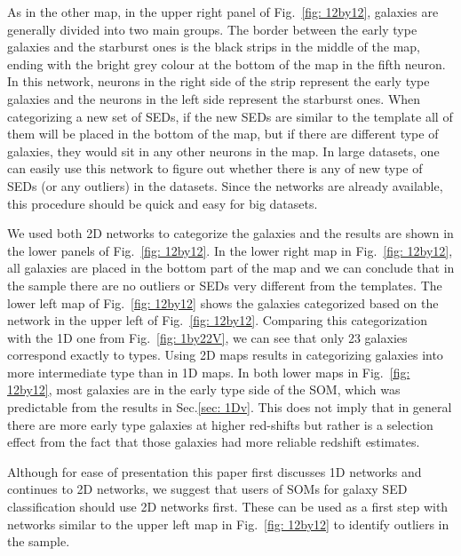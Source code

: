     As in the other map, in the upper right panel of Fig.~\ref{fig: 12by12}, galaxies are generally divided into two main groups.
    The border between the early type galaxies and the starburst ones is the black strips in the middle of the map,  ending with the bright grey colour at the bottom of the map in the fifth neuron.
    In this network, neurons in the right side of the strip represent the early type galaxies and the neurons in the left side represent the starburst ones. 
    When categorizing a new set of SEDs, if the new SEDs are similar to the  template all of them will be placed in the bottom of the map, but if there are different type of galaxies, they would sit in any other neurons in the map.
    In large datasets, one can easily use this network to figure out whether there is any of new type of SEDs (or any outliers) in the datasets. 
    Since the networks are already available, this procedure should be quick and easy for big datasets.
    
    We used both 2D networks to categorize the  galaxies and the results are shown in the lower panels of Fig.~\ref{fig: 12by12}.
    In the lower right map in Fig.~\ref{fig: 12by12}, all galaxies are placed in the bottom part of the map and we can conclude that in the  sample there are no outliers or SEDs very different from  the  templates.
    The lower left map of Fig.~\ref{fig: 12by12} shows the  galaxies categorized based on the network in the upper left of Fig.~\ref{fig: 12by12}. 
    Comparing this categorization with the 1D one from Fig.~\ref{fig: 1by22V}, we can see that only 23 galaxies correspond exactly to  types.
    Using 2D maps results in categorizing galaxies into more intermediate type than in 1D maps.
    In both lower maps in Fig.~\ref{fig: 12by12}, most galaxies are in the early type side of the SOM, which was predictable from the results in Sec.\ref{sec: 1Dv}. This does not imply that in general there are more early type galaxies at higher red-shifts but rather is a selection effect from the fact that those galaxies had more reliable redshift estimates.
    
    Although for ease of presentation this paper first discusses 1D networks and continues to 2D networks, we suggest that users of SOMs for galaxy SED classification should use 2D networks first. These can be used as a first step with networks similar to the upper left map in Fig.~\ref{fig: 12by12} to identify outliers in the sample.


